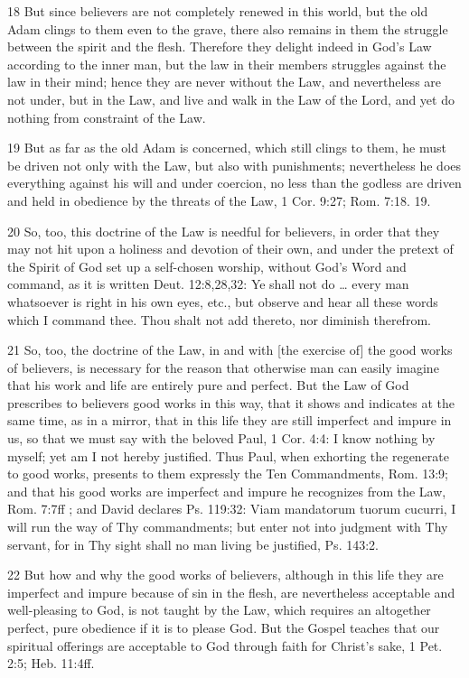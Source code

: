 18 But since believers are not completely renewed in this world, but the old Adam clings to them even to the grave, there also remains in them the struggle between the spirit and the flesh. Therefore they delight indeed in God’s Law according to the inner man, but the law in their members struggles against the law in their mind; hence they are never without the Law, and nevertheless are not under, but in the Law, and live and walk in the Law of the Lord, and yet do nothing from constraint of the Law.

19 But as far as the old Adam is concerned, which still clings to them, he must be driven not only with the Law, but also with punishments; nevertheless he does everything against his will and under coercion, no less than the godless are driven and held in obedience by the threats of the Law, 1 Cor. 9:27; Rom. 7:18. 19.

20 So, too, this doctrine of the Law is needful for believers, in order that they may not hit upon a holiness and devotion of their own, and under the pretext of the Spirit of God set up a self-chosen worship, without God’s Word and command, as it is written Deut. 12:8,28,32: Ye shall not do … every man whatsoever is right in his own eyes, etc., but observe and hear all these words which I command thee. Thou shalt not add thereto, nor diminish therefrom.

21 So, too, the doctrine of the Law, in and with [the exercise of] the good works of believers, is necessary for the reason that otherwise man can easily imagine that his work and life are entirely pure and perfect. But the Law of God prescribes to believers good works in this way, that it shows and indicates at the same time, as in a mirror, that in this life they are still imperfect and impure in us, so that we must say with the beloved Paul, 1 Cor. 4:4: I know nothing by myself; yet am I not hereby justified. Thus Paul, when exhorting the regenerate to good works, presents to them expressly the Ten Commandments, Rom. 13:9; and that his good works are imperfect and impure he recognizes from the Law, Rom. 7:7ff ; and David declares Ps. 119:32: Viam mandatorum tuorum cucurri, I will run the way of Thy commandments; but enter not into judgment with Thy servant, for in Thy sight shall no man living be justified, Ps. 143:2.

22 But how and why the good works of believers, although in this life they are imperfect and impure because of sin in the flesh, are nevertheless acceptable and well-pleasing to God, is not taught by the Law, which requires an altogether perfect, pure obedience if it is to please God. But the Gospel teaches that our spiritual offerings are acceptable to God through faith for Christ’s sake, 1 Pet. 2:5; Heb. 11:4ff.

